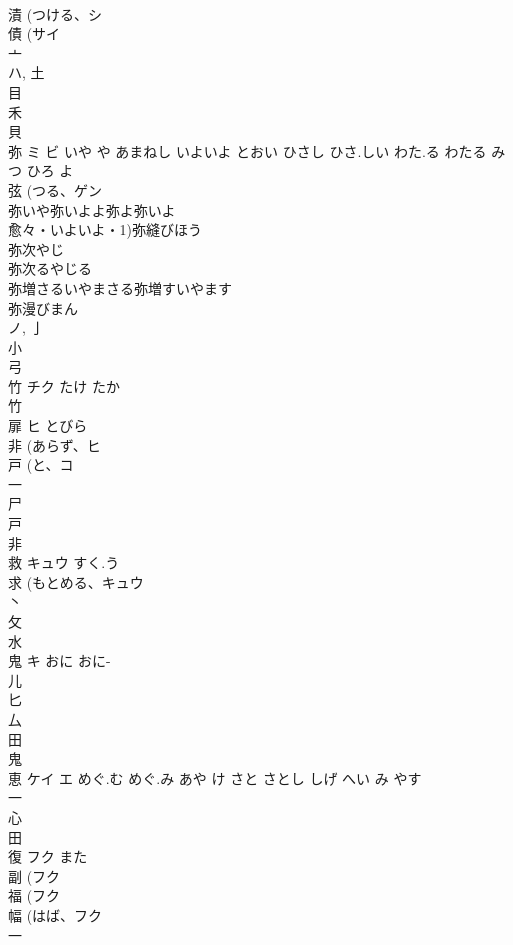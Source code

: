 \documentclass[8pt]{extreport}
\begin{document}
\begin{CJK}{UTF8}{min}
\\	漬 (つける、シ 
\\	債 (サイ 
\\	亠 
\\	ハ, 土 
\\	目 
\\	禾 
\\	貝 
\\	弥	ミ ビ	いや や あまねし いよいよ とおい ひさし ひさ.しい わた.る わたる みつ ひろ よ	
\\	弦 (つる、ゲン 
\\	弥いや弥いよよ弥よ弥いよ
\\	愈々・いよいよ・1)弥縫びほう
\\	弥次やじ
\\	弥次るやじる
\\	弥増さるいやまさる弥増すいやます
\\	弥漫びまん
\\	ノ, 亅 
\\	小 
\\	弓 
\\	竹	チク	たけ たか	
\\	竹 
\\	扉	ヒ	とびら	
\\	非 (あらず、ヒ 
\\	戸 (と、コ 
\\	一 
\\	尸 
\\	戸 
\\	非 
\\	救	キュウ	すく.う	
\\	求 (もとめる、キュウ 
\\	丶 
\\	攵 
\\	水 
\\	鬼	キ	おに おに-	
\\	儿 
\\	匕 
\\	厶 
\\	田 
\\	鬼 
\\	恵	ケイ エ	めぐ.む めぐ.み あや け さと さとし しげ へい み やす	
\\	一 
\\	心 
\\	田 
\\	復	フク	また	
\\	副 (フク 
\\	福 (フク 
\\	幅 (はば、フク 
\\	一 

\end{CJK}
\end{document}
